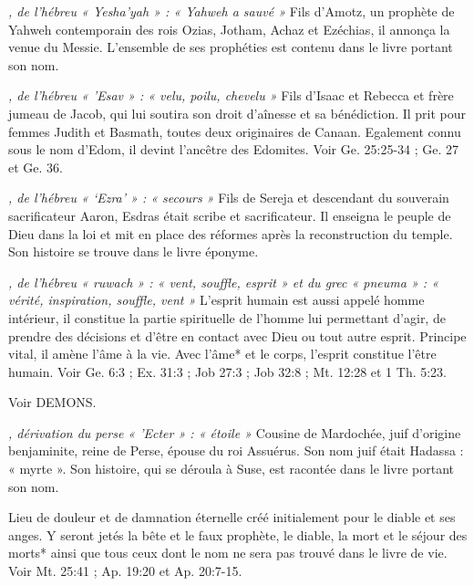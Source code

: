 \begin{multicols}{2}
{\textit{, de l'hébreu « Yesha'yah » : « Yahweh a sauvé »}\newline
Fils d'Amotz, un prophète de Yahweh contemporain des rois Ozias, Jotham, Achaz et Ezéchias, il annonça la venue du Messie. L'ensemble de ses prophéties est contenu dans le livre portant son nom.

\textit{, de l'hébreu « 'Esav » : « velu, poilu, chevelu »}\newline
Fils d'Isaac et Rebecca et frère jumeau de Jacob, qui lui soutira son droit d'aînesse et sa bénédiction. Il prit pour femmes Judith et Basmath, toutes deux originaires de Canaan. Egalement connu sous le nom d'Edom, il devint l'ancêtre des Edomites. Voir Ge. 25:25-34 ; Ge. 27 et Ge. 36.

\textit{, de l'hébreu « `Ezra' » : « secours »}\newline
Fils de Sereja et descendant du souverain sacrificateur Aaron, Esdras était scribe et sacrificateur. Il enseigna le peuple de Dieu dans la loi et mit en place des réformes après la reconstruction du temple. Son histoire se trouve dans le livre éponyme.

\textit{, de l'hébreu « ruwach » : « vent, souffle, esprit » et du grec « pneuma » : « vérité, inspiration, souffle, vent »}\newline
L'esprit humain est aussi appelé homme intérieur, il constitue la partie spirituelle de l'homme lui permettant d'agir, de prendre des décisions et d'être en contact avec Dieu ou tout autre esprit. Principe vital, il amène l'âme à la vie. Avec l'âme* et le corps, l'esprit constitue l'être humain. Voir Ge. 6:3 ; Ex. 31:3 ; Job 27:3 ; Job 32:8 ; Mt. 12:28 et 1 Th. 5:23.

\textit{}\newline
Voir DEMONS.

\textit{, dérivation du perse « 'Ecter » : « étoile »}\newline
Cousine de Mardochée, juif d'origine benjaminite, reine de Perse, épouse du roi Assuérus. Son nom juif était Hadassa : « myrte ». Son histoire, qui se déroula à Suse, est racontée dans le livre portant son nom.

\textit{}\newline
Lieu de douleur et de damnation éternelle créé initialement pour le diable et ses anges. Y seront jetés la bête et le faux prophète, le diable, la mort et le séjour des morts* ainsi que tous ceux dont le nom ne sera pas trouvé dans le livre de vie. Voir Mt. 25:41 ; Ap. 19:20 et Ap. 20:7-15.

}
\end{multicols}
